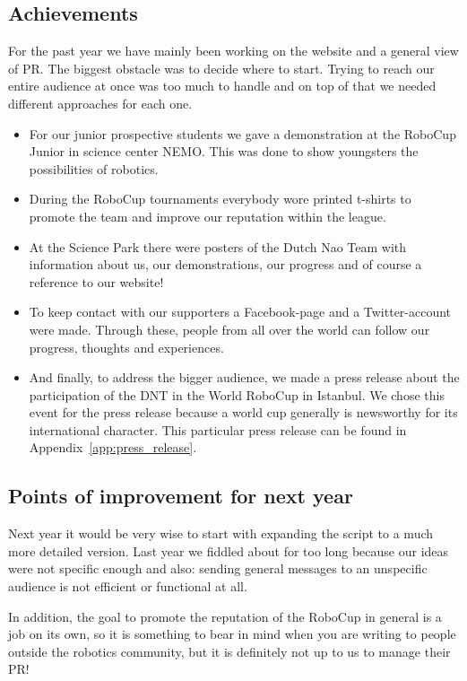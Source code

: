 \documentclass[11pt,a4paper,oneside]{article}
\begin{document}
\subsection{Achievements}
For the past year we have mainly been working on the website and a general view of PR. The biggest obstacle was to decide where to start. Trying to reach our entire audience at once was too much to handle and on top of that we needed different approaches for each one.
\begin{itemize}
\item For our junior prospective students we gave a demonstration at the RoboCup Junior in science center NEMO. This was done to show youngsters the possibilities of robotics.
\item During the RoboCup tournaments everybody wore printed t-shirts to promote the team and improve our reputation within the league. 
\item At the Science Park there were posters of the Dutch Nao Team with information about us, our demonstrations, our progress and of course a reference to our website!
\item To keep contact with our supporters a Facebook-page and a Twitter-account were made. Through these, people from all over the world can follow our progress, thoughts and experiences.
\item And finally, to address the bigger audience, we made a press release about the participation of the DNT in the World RoboCup in Istanbul. We chose this event for the press release because a world cup generally is newsworthy for its international character. This particular press release can be found in Appendix~\ref{app:press_release}.
\end{itemize}

\subsection{Points of improvement for next year}
Next year it would be very wise to start with expanding the script to a much more detailed version. Last year we fiddled about for too long because our ideas were not specific enough and also: sending general messages to an unspecific audience is not efficient or functional at all. 

In addition, the goal to promote the reputation of the RoboCup in general is a job on its own, so it is something to bear in mind when you are writing to people outside the robotics community, but it is definitely not up to us to manage their PR!
\end{document}
